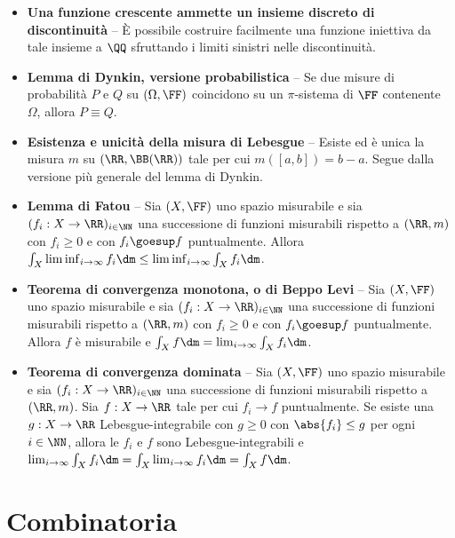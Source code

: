 \begin{multicols*}{2}
\begin{itemize}
    \item \textbf{Una funzione crescente ammette un insieme discreto di discontinuità} --
    È possibile costruire facilmente una funzione iniettiva da tale insieme a $\QQ$ sfruttando
    i limiti sinistri nelle discontinuità.
    \item \textbf{Lemma di Dynkin, versione probabilistica} -- Se
    due misure di probabilità $P$ e $Q$ su $(\Omega, \FF)$ coincidono su un $\pi$-sistema di $\FF$
    contenente $\Omega$, allora $P \equiv Q$.
    \item \textbf{Esistenza e unicità della misura di Lebesgue} -- Esiste ed
    è unica la misura $m$ su $(\RR, \BB(\RR))$ tale per cui
    $m([a, b]) = b-a$. Segue dalla versione più generale del lemma di Dynkin.
    \item \textbf{Lemma di Fatou} --
    Sia $(X, \FF)$ uno spazio misurabile e sia $(f_i : X \to \RR)_{i \in \NN}$ una successione di funzioni misurabili rispetto
    a $(\RR, m)$ con $f_i \geq 0$ e con
    $f_i \goesup f$ puntualmente. Allora $\int_X \liminf_{i \to \infty} f_i \dm \leq \liminf_{i \to \infty} \int_X f_i \dm$.
    \item \textbf{Teorema di convergenza monotona, o di Beppo Levi} --
    Sia $(X, \FF)$ uno spazio misurabile e sia $(f_i : X \to \RR)_{i \in \NN}$ una successione di funzioni misurabili rispetto
    a $(\RR, m)$ con $f_i \geq 0$ e con
    $f_i \goesup f$ puntualmente. Allora $f$ è misurabile e $\int_X f \dm = \lim_{i \to \infty} \int_X f_i \dm$.
    \item \textbf{Teorema di convergenza dominata} --
    Sia $(X, \FF)$ uno spazio misurabile e sia $(f_i : X \to \RR)_{i \in \NN}$ una successione di funzioni misurabili rispetto
    a $(\RR, m)$. Sia $f : X \to \RR$ tale per cui
    $f_i \to f$ puntualmente. Se esiste una
    $g : X \to \RR$ Lebesgue-integrabile con $g \geq 0$ con
    $\abs{f_i} \leq g$ per ogni $i \in \NN$, allora le $f_i$ e $f$
    sono Lebesgue-integrabili e $\lim_{i \to \infty} \int_X f_i \dm = \int_X \lim_{i \to \infty} f_i \dm = \int_X f \dm$.
\end{itemize}

\section*{Combinatoria}


\end{multicols*}

